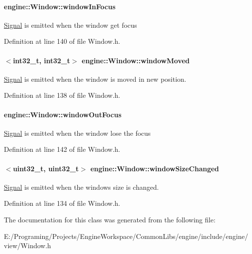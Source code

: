\paragraph[{\texorpdfstring{window\+In\+Focus}{windowInFocus}}]{ engine\+::\+Window\+::window\+In\+Focus}\hypertarget{a00082_a2a81dc83b5e8433eb39e1ca8263d0c0f}{}\label{a00082_a2a81dc83b5e8433eb39e1ca8263d0c0f}
\hyperlink{a00065}{Signal} is emitted when the window get focus 

Definition at line 140 of file Window.\+h.

\paragraph[{\texorpdfstring{window\+Moved}{windowMoved}}]{$<$int32\+\_\+t, int32\+\_\+t$>$ engine\+::\+Window\+::window\+Moved}\hypertarget{a00082_a4bdb42d789ed9587ff8f840065752506}{}\label{a00082_a4bdb42d789ed9587ff8f840065752506}
\hyperlink{a00065}{Signal} is emitted when the window is moved in new position. 

Definition at line 138 of file Window.\+h.

\paragraph[{\texorpdfstring{window\+Out\+Focus}{windowOutFocus}}]{ engine\+::\+Window\+::window\+Out\+Focus}\hypertarget{a00082_af6f8cc0d616685683d5c6b52b4cc07d0}{}\label{a00082_af6f8cc0d616685683d5c6b52b4cc07d0}
\hyperlink{a00065}{Signal} is emitted when the window lose the focus 

Definition at line 142 of file Window.\+h.

\paragraph[{\texorpdfstring{window\+Size\+Changed}{windowSizeChanged}}]{$<$uint32\+\_\+t, uint32\+\_\+t$>$ engine\+::\+Window\+::window\+Size\+Changed}\hypertarget{a00082_a20978a09b8843aa8960dc9d3a989b11a}{}\label{a00082_a20978a09b8843aa8960dc9d3a989b11a}
\hyperlink{a00065}{Signal} is emitted when the window\textquotesingle{}s size is changed. 

Definition at line 134 of file Window.\+h.



The documentation for this class was generated from the following file\+:\begin{DoxyCompactItemize}
\item 
E\+:/\+Programing/\+Projects/\+Engine\+Workspace/\+Common\+Libs/engine/include/engine/view/Window.\+h\end{DoxyCompactItemize}
